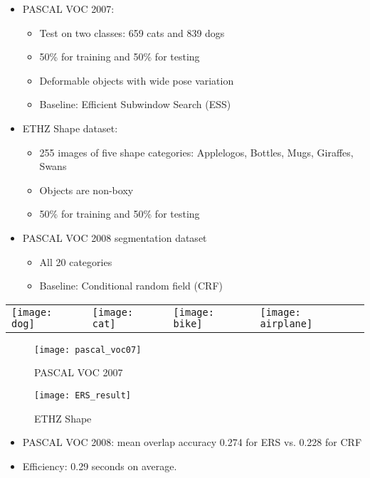\documentclass[11pt, a4paper, landscape]{article}
\begin{document}
\NewPage{}
\vfill
\begin{itemize}
\item PASCAL VOC 2007:
\begin{itemize}
\item Test on two classes: 659 cats and 839 dogs
\item 50\% for training and 50\% for testing
\item Deformable objects with wide pose variation
\item Baseline: Efficient Subwindow Search (ESS)
\end{itemize}
\item ETHZ Shape dataset:
\begin{itemize}
\item 255 images of five shape categories: Applelogos, Bottles, Mugs, Giraffes, Swans
\item Objects are non-boxy
\item 50\% for training and 50\% for testing
\end{itemize}
\item PASCAL VOC 2008 segmentation dataset
\begin{itemize}
\item All 20 categories
\item Baseline: Conditional random field (CRF)
\end{itemize}
\end{itemize}
\begin{table}
  \centering
  \begin{tabular}{@{} M{.25\linewidth} M{.25\linewidth} M{.25\linewidth} M{.25\linewidth} @{}}
      \texttt{[image: dog]}%
      &
      \texttt{[image: cat]}%
      &
      \texttt{[image: bike]}%
      &
      \texttt{[image: airplane]}%
  \end{tabular}
\end{table}
\vfill


\NewPage{}
\vfill
\begin{figure}
	\centering
	\texttt{[image: pascal\_voc07]}
	\caption{PASCAL VOC 2007}
\end{figure}
\begin{figure}
	\centering
	\texttt{[image: ERS\_result]}
	\caption{ETHZ Shape}
\end{figure}
\begin{itemize}
\item PASCAL VOC 2008: mean overlap accuracy 0.274 for ERS vs. 0.228 for CRF
\item Efficiency: 0.29 seconds on average.
\end{itemize}
\vfill
\end{document}
